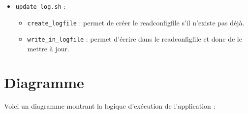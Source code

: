 \documentclass{article}
\begin{document}
\begin{itemize}
\begin{itemize}[label=\textbullet]
        \end{itemize}
        \vspace{0.3em}
    \item \texttt{update\_log.sh} :
        \begin{itemize}[label=\textbullet]
            \item \texttt{create\_logfile} : permet de créer le readconfigfile s'il n'existe pas déjà.
            \item \texttt{write\_in\_logfile} : permet d'écrire dans le readconfigfile et donc de le mettre à jour.
        \end{itemize}
\end{itemize}

\newpage
\section{Diagramme}

Voici un diagramme montrant la logique d'exécution de l'application :
\vspace{1em}
  
\end{document}
